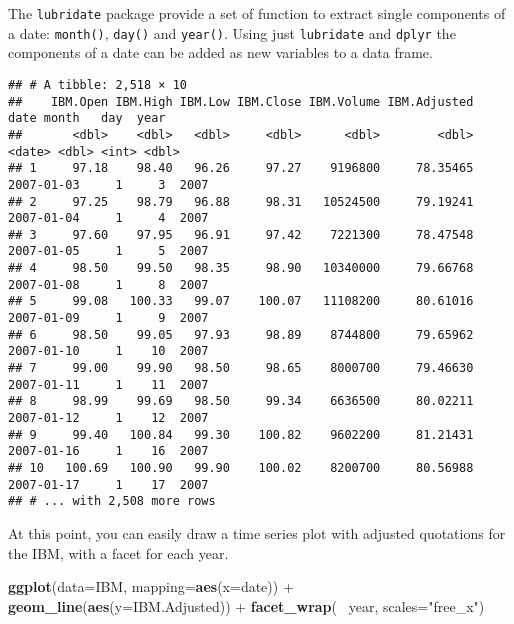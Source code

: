 \documentclass[]{book}
\newenvironment{Shaded}{\begin{snugshade}}{\end{snugshade}}
\newcommand{\KeywordTok}[1]{\textcolor[rgb]{0.13,0.29,0.53}{\textbf{{#1}}}}
\newcommand{\DataTypeTok}[1]{\textcolor[rgb]{0.13,0.29,0.53}{{#1}}}
\newcommand{\StringTok}[1]{\textcolor[rgb]{0.31,0.60,0.02}{{#1}}}
\newcommand{\NormalTok}[1]{{#1}}
\begin{document}
The \texttt{lubridate} package provide a set of function to extract
single components of a date: \texttt{month()}, \texttt{day()} and
\texttt{year()}. Using just \texttt{lubridate} and \texttt{dplyr} the
components of a date can be added as new variables to a data frame.

\begin{Shaded}
\end{Shaded}

\begin{verbatim}
## # A tibble: 2,518 × 10
##    IBM.Open IBM.High IBM.Low IBM.Close IBM.Volume IBM.Adjusted       date month   day  year
##       <dbl>    <dbl>   <dbl>     <dbl>      <dbl>        <dbl>     <date> <dbl> <int> <dbl>
## 1     97.18    98.40   96.26     97.27    9196800     78.35465 2007-01-03     1     3  2007
## 2     97.25    98.79   96.88     98.31   10524500     79.19241 2007-01-04     1     4  2007
## 3     97.60    97.95   96.91     97.42    7221300     78.47548 2007-01-05     1     5  2007
## 4     98.50    99.50   98.35     98.90   10340000     79.66768 2007-01-08     1     8  2007
## 5     99.08   100.33   99.07    100.07   11108200     80.61016 2007-01-09     1     9  2007
## 6     98.50    99.05   97.93     98.89    8744800     79.65962 2007-01-10     1    10  2007
## 7     99.00    99.90   98.50     98.65    8000700     79.46630 2007-01-11     1    11  2007
## 8     98.99    99.69   98.50     99.34    6636500     80.02211 2007-01-12     1    12  2007
## 9     99.40   100.84   99.30    100.82    9602200     81.21431 2007-01-16     1    16  2007
## 10   100.69   100.90   99.90    100.02    8200700     80.56988 2007-01-17     1    17  2007
## # ... with 2,508 more rows
\end{verbatim}

At this point, you can easily draw a time series plot with adjusted
quotations for the IBM, with a facet for each year.

\begin{Shaded}
\begin{Highlighting}[]
\KeywordTok{ggplot}\NormalTok{(}\DataTypeTok{data=}\NormalTok{IBM, }\DataTypeTok{mapping=}\KeywordTok{aes}\NormalTok{(}\DataTypeTok{x=}\NormalTok{date)) +}
\StringTok{  }\KeywordTok{geom_line}\NormalTok{(}\KeywordTok{aes}\NormalTok{(}\DataTypeTok{y=}\NormalTok{IBM.Adjusted)) +}\StringTok{ }
\StringTok{  }\KeywordTok{facet_wrap}\NormalTok{(~}\StringTok{ }\NormalTok{year, }\DataTypeTok{scales=}\StringTok{"free_x"}\NormalTok{)}
\end{Highlighting}
\end{Shaded}
\end{document}
